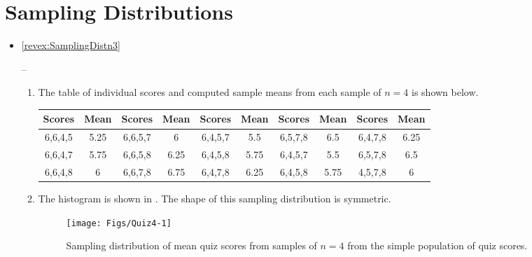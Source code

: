 \documentclass[10pt,openany]{book}\usepackage[]{graphicx}\usepackage[]{color}
\newenvironment{knitrout}{}{} %
\begin{document}
\section*{Sampling Distributions}
\begin{itemize}
  \item \hypertarget{ans:SamplingDistn3}{\ref{revex:SamplingDistn3}} --
    \begin{enumerate}
      \item The table of individual scores and computed sample means from each sample of $n=4$ is shown below.
      \begin{center}
        \begin{tabular}{cc||cc||cc||cc||cc}
\hline\hline
Scores & Mean & Scores & Mean & Scores &  Mean & Scores & Mean & Scores & Mean \\
\hline
6,6,4,5 & 5.25 & 6,6,5,7 & 6    & 6,4,5,7 & 5.5  & 6,5,7,8 & 6.5  & 6,4,7,8 & 6.25 \\
6,6,4,7 & 5.75 & 6,6,5,8 & 6.25 & 6,4,5,8 & 5.75 & 6,4,5,7 & 5.5  & 6,5,7,8 & 6.5  \\
6,6,4,8 & 6    & 6,6,7,8 & 6.75 & 6,4,7,8 & 6.25 & 6,4,5,8 & 5.75 & 4,5,7,8 & 6    \\
\hline\hline
         \end{tabular}
      \end{center}

      \item The histogram is shown in .  The shape of this sampling distribution is symmetric.
\begin{knitrout}
\color{fgcolor}\begin{figure}[hbtp]

{\centering \texttt{[image: Figs/Quiz4-1]} 

}

\caption[Sampling distribution of mean quiz scores from samples of $n=4$ from the simple population of quiz scores]{Sampling distribution of mean quiz scores from samples of $n=4$ from the simple population of quiz scores.}\label{fig:Quiz4}
\end{figure}



\end{knitrout}
\end{enumerate}
\end{itemize}
\end{document}
